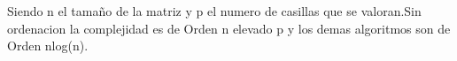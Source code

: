 Siendo n el tamaño de la matriz y p el numero de casillas que se valoran.Sin ordenacion la complejidad es de Orden n elevado p y los demas algoritmos son de Orden nlog(n).
